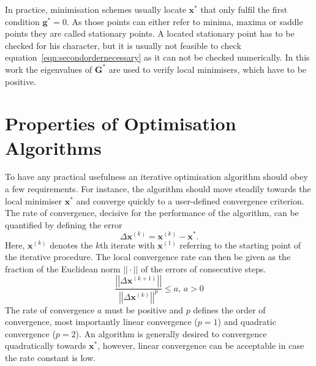 In practice, minimisation schemes usually locate $\mathbf{x^*}$ that only
fulfil the first condition $\mathbf{g^*}=0$. As those points can
either refer to minima, maxima or saddle points they are called stationary
points. A located stationary point has to be checked for his character, but it
is usually not feasible to check equation~\eqref{eqn:secondordernecessary} as
it can not be checked numerically. In this work the eigenvalues of
$\mathbf{G^*}$ are used to verify local minimisers, which have to be
positive.

\section{Properties of Optimisation Algorithms}
\label{sec:PropertiesOfOptimisationAlgorithms}

To have any practical usefulness an iterative optimisation algorithm should
obey a few requirements. For instance, the algorithm should move steadily
towards the local minimiser $\mathbf{x^*}$ and converge quickly to a
user-defined convergence criterion. The rate of convergence, decisive for the
performance of the algorithm, can be quantified by defining the error
%
\begin{equation}
    \Delta\mathbf{x}^{(k)}=\mathbf{x}^{(k)}-\mathbf{x^*}.
\end{equation}
%
Here, $\mathbf{x}^{(k)}$ denotes the $k$th iterate with $\mathbf{x}^{(1)}$
referring to the starting point of the iterative procedure. The local
convergence rate can then be given as the fraction of the Euclidean norm
$||\cdot||$ of the errors of consecutive steps.
%
\begin{equation}
    \frac{\left|\left|\Delta\mathbf{x}^{(k+1)}\right|\right|}{\left|\left|\Delta\mathbf{x}^{(k)}\right|\right|^{p}}\leq a, \,a>0
\end{equation}
%
The rate of convergence $a$ must be positive and $p$ defines the order of
convergence, most importantly linear convergence ($p=1$) and quadratic
convergence ($p=2$). An algorithm is generally desired to convergence
quadratically towards $\mathbf{x^*}$, however, linear convergence can be
acceptable in case the rate constant is low.

